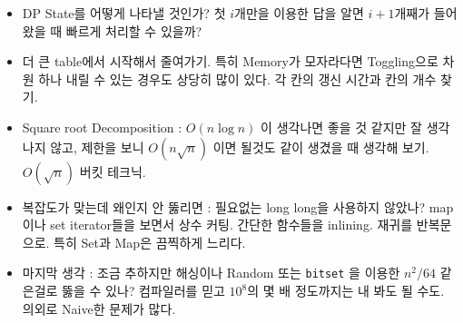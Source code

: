 \documentclass[landscape,8pt]{article}
\begin{document}
\begin{multicols}{2}
\begin{itemize}
      \item DP State를 어떻게 나타낼 것인가? 첫 $i$개만을 이용한 답을 알면 $i+1$개째가 들어왔을 때 빠르게 처리할 수 있을까?
      \item 더 큰 table에서 시작해서 줄여가기. 특히 Memory가 모자라다면 Toggling으로 차원 하나 내릴 수 있는 경우도 상당히 많이 있다. 각 칸의 갱신 시간과 칸의 개수 찾기.
      \item Square root Decomposition : $O(n \log n)$ 이 생각나면 좋을 것 같지만 잘 생각나지 않고, 제한을 보니 $O(n \sqrt{n})$ 이면 될것도 같이 생겼을 때 생각해 보기. $O(\sqrt{n})$ 버킷 테크닉.
      \item 복잡도가 맞는데 왜인지 안 뚫리면 : 필요없는 long long을 사용하지 않았나? map이나 set iterator들을 보면서 상수 커팅. 간단한 함수들을 inlining. 재귀를 반복문으로. 특히 Set과 Map은 끔찍하게 느리다.
      \item 마지막 생각 : 조금 추하지만 해싱이나 Random 또는 \texttt{bitset} 을 이용한 $n^2 / 64$ 같은걸로 뚫을 수 있나? 컴파일러를 믿고 $10^8$의 몇 배 정도까지는 내 봐도 될 수도. 의외로 Naive한 문제가 많다.
    \end{itemize}

\end{multicols}
\end{document}
